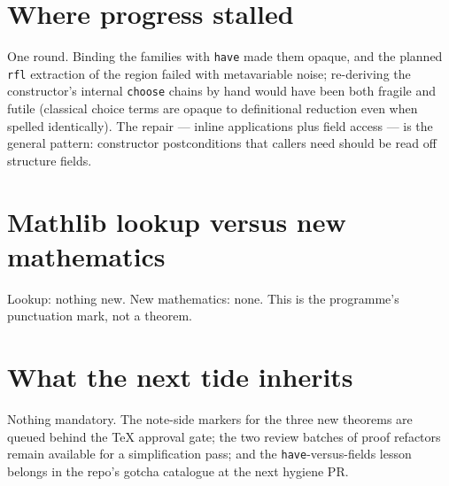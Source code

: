 \documentclass[11pt]{article}
\newcommand{\code}[1]{\texttt{#1}}
\begin{document}
\section{Where progress stalled}

One round. Binding the families with \code{have} made them opaque,
and the planned \code{rfl} extraction of the region failed with
metavariable noise; re-deriving the constructor's internal
\code{choose} chains by hand would have been both fragile and
futile (classical choice terms are opaque to definitional
reduction even when spelled identically). The repair --- inline
applications plus field access --- is the general pattern:
constructor postconditions that callers need should be read off
structure fields.

\section{Mathlib lookup versus new mathematics}

Lookup: nothing new. New mathematics: none. This is the programme's
punctuation mark, not a theorem.

\section{What the next tide inherits}

Nothing mandatory. The note-side markers for the three new theorems
are queued behind the TeX approval gate; the two review batches of
proof refactors remain available for a simplification pass; and the
\code{have}-versus-fields lesson belongs in the repo's gotcha
catalogue at the next hygiene PR.
\end{document}
